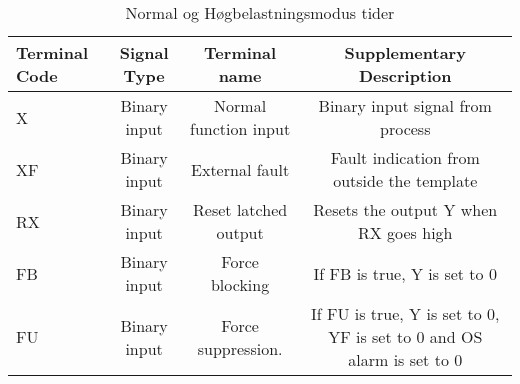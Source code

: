 \begin{table}[h]
    \centering
    \small %
    \begin{tabular}{|l|c|c|c|}
        \hline
        \rowcolor{myblack} %
        \textcolor{purewhite}{Terminal Code} & \textcolor{purewhite}{Signal Type} & \textcolor{purewhite}{Terminal name} & \textcolor{purewhite}{Supplementary Description}\\ \hline
        \rowcolor{lightgray}  X  & Binary input & Normal function input & Binary input signal from process \\ \hline
        \rowcolor{purewhite}  XF & Binary input & External fault & Fault indication from outside the template \\ \hline
        \rowcolor{lightgray}  RX & Binary input & Reset latched output & Resets the output Y when RX goes high \\ \hline
        \rowcolor{purewhite}  FB & Binary input & Force blocking & If FB is true, Y is set to 0 \\ \hline
        \rowcolor{lightgray}  FU & Binary input & Force suppression. & If FU is true, Y is set to 0, YF is set to 0 and OS
        alarm is set to 0 \\ \hline
    \end{tabular}
    \caption{Normal og Høgbelastningsmodus tider}\label{table:MB Blokk}
\end{table}